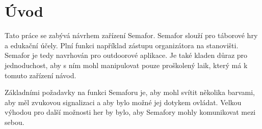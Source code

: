 \chapter*{Úvod}
{}

Tato práce se zabývá návrhem zařízení Semafor. Semafor slouží pro táborové hry a edukační účely. Plní funkci například zástupu organizátora 
na stanovišti. 
Semafor je tedy navrhován pro outdoorové aplikace. Je také kladen důraz pro jednoduchost, aby s ním mohl manipulovat pouze proškolený laik, 
který má k tomuto zařízení návod. 

Základními požadavky na funkci Semaforu je, aby mohl svítit několika barvami, aby měl zvukovou signalizaci a aby bylo možné jej dotykem ovládat.
Velkou výhodou pro další možnosti her by bylo, aby Semafory mohly komunikovat mezi sebou. 



